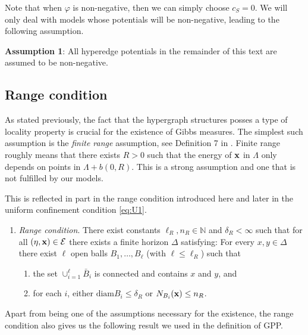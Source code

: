 Note that when $\varphi$ is non-negative, then we can simply choose $c_S = 0$. We will only deal with models whose potentials will be non-negative, leading to the following assumption.\newline

\tbd
{}

\noindent \textbf{Assumption 1}: All hyperedge potentials in the remainder of this text are assumed to be non-negative.

\subsection{Range condition} \label{sec:range}
As stated previously, the fact that the hypergraph structures posses a type of locality property is crucial for the existence of Gibbs measures. The simplest such assumption is the \textit{finite range} assumption, see Definition 7 in \cite{Dereudre2017}. Finite range roughly means that there exists $R>0$ such that the energy of ${\mathbf{x}}$ in $\Lambda$ only depends on points in $\Lambda + b(0,R)$. This is a strong assumption and one that is not fulfilled by our models. 

This is reflected in part in the range condition introduced here and later in the uniform confinement condition \eqref{eq:U1}.

\begin{enumerate}[\textbf{(R)}]\label{(R)}
	\item \textit{Range condition}. There exist constants $\ell_R,n_R \in \mathbb N$ and $\delta_R < \infty$ such that for all $(\eta,{\mathbf{x}}) \in \mathcal E$ there exists a finite horizon $\Delta$ satisfying: For every $x,y \in \Delta$ there exist $\ell$ open balls $B_1, \dots, B_\ell$ (with $\ell \leq \ell_R$) such that
	\begin{enumerate}[-]
		\item the set $\cup^\ell_{i=1} \bar B_i$ is connected and contains $x$ and $y$, and 
		\item for each $i$, either $\text{diam} B_i \leq \delta_R$ or $N_{B_i}({\mathbf{x}}) \leq n_R$.
	\end{enumerate}
\end{enumerate}


Apart from being one of the assumptions necessary for the existence, the range condition also gives us the following result we used in the definition of GPP.

